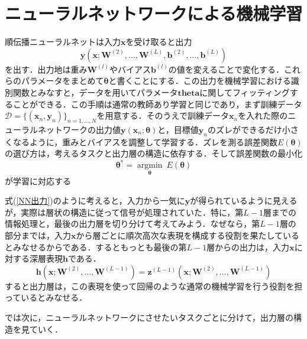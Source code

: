 \documentclass[a4paper,11pt]{jsreport}
\begin{document}
\section{ニューラルネットワークによる機械学習}
順伝播ニューラルネットは入力$\bm{x}$を受け取ると出力
\begin{equation}
  \bm{y}\left( \bm{x}; \bm{W}^{(2)},\dots ,\bm{W}^{(L)},\bm{b}^{(2)},\dots ,\bm{b}^{(L)} \right) \label{NN出力}
\end{equation}
を出す．出力地は重み$\bm{W}^{(l)}$やバイアス$\bm{b}^{(l)}$の値を変えることで変化する．これらのパラメータをまとめて$\bm{\theta}$と書くことにする．この出力を機械学習における識別関数とみなすと，データを用いてパラメータ$\bm{theta}$に関してフィッティングすることができる．この手順は通常の教師あり学習と同じであり，まず訓練データ$\mathcal{D}=\{ (\bm{x}_n, \bm{y}_n) \}_{n=1,\dots ,N}$を用意する．そのうえで訓練データ$\bm{x}_n$を入れた際のニューラルネットワークの出力値$\bm{y}(\bm{x}_n; \bm{\theta})$と，目標値$\bm{y}_n$のズレができるだけ小さくなるように，重みとバイアスを調整して学習する．ズレを測る誤差関数$E(\bm{\theta})$の選び方は，考えるタスクと出力層の構造に依存する．そして誤差関数の最小化
\begin{equation}
  \bm{\theta}^* = \underset{\bm{\theta}} {\operatorname{argmin}} \ E(\bm{\theta})
\end{equation}
が学習に対応する\par
式(\ref{NN出力})のように考えると，入力から一気に$\bm{y}$が得られているように見えるが，実際は層状の構造に従って信号が処理されていた．特に，第$L-1$層までの情報処理と，最後の出力層を切り分けて考えてみよう．なぜなら，第$L-1$層の部分までは，入力$\bm{x}$から層ごとに順次高次な表現を構成する役割を果たしているとみなせるからである．するともっとも最後の第$L-1$層からの出力は，入力$\bm{x}$に対する深層表現$\bm{h}$である．
\begin{equation}
  \bm{h}\left( \bm{x}; \bm{W}^{(2)},\dots ,\bm{W}^{(L-1)} \right)
  = \bm{z}^{(L-1)}\left( \bm{x}; \bm{W}^{(2)},\dots ,\bm{W}^{(L-1)} \right)
\end{equation}
すると出力層は，この表現を使って回帰のような通常の機械学習を行う役割を担っているとみなせる．\par
では次に，ニューラルネットワークにさせたいタスクごとに分けて，出力層の構造を見ていく．
\end{document}
